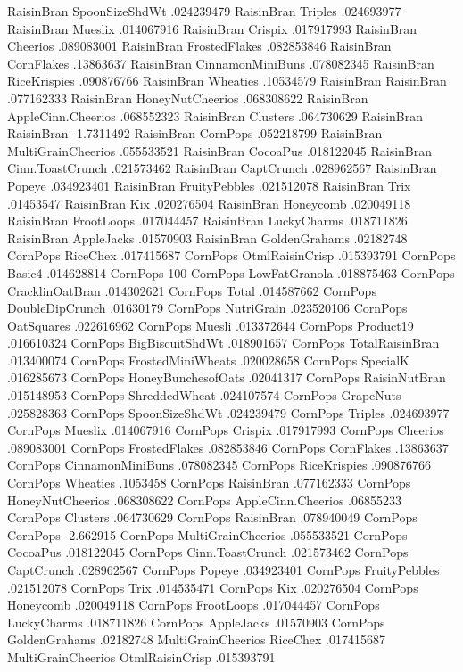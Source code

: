 RaisinBran	SpoonSizeShdWt	.024239479
RaisinBran	Triples	.024693977
RaisinBran	Mueslix	.014067916
RaisinBran	Crispix	.017917993
RaisinBran	Cheerios	.089083001
RaisinBran	FrostedFlakes	.082853846
RaisinBran	CornFlakes	.13863637
RaisinBran	CinnamonMiniBuns	.078082345
RaisinBran	RiceKrispies	.090876766
RaisinBran	Wheaties	.10534579
RaisinBran	RaisinBran	.077162333
RaisinBran	HoneyNutCheerios	.068308622
RaisinBran	AppleCinn.Cheerios	.068552323
RaisinBran	Clusters	.064730629
RaisinBran	RaisinBran	-1.7311492
RaisinBran	CornPops	.052218799
RaisinBran	MultiGrainCheerios	.055533521
RaisinBran	CocoaPus	.018122045
RaisinBran	Cinn.ToastCrunch	.021573462
RaisinBran	CaptCrunch	.028962567
RaisinBran	Popeye	.034923401
RaisinBran	FruityPebbles	.021512078
RaisinBran	Trix	.01453547
RaisinBran	Kix	.020276504
RaisinBran	Honeycomb	.020049118
RaisinBran	FrootLoops	.017044457
RaisinBran	LuckyCharms	.018711826
RaisinBran	AppleJacks	.01570903
RaisinBran	GoldenGrahams	.02182748
CornPops	RiceChex	.017415687
CornPops	OtmlRaisinCrisp	.015393791
CornPops	Basic4	.014628814
CornPops	100%
CornPops	LowFatGranola	.018875463
CornPops	CracklinOatBran	.014302621
CornPops	Total	.014587662
CornPops	DoubleDipCrunch	.01630179
CornPops	NutriGrain	.023520106
CornPops	OatSquares	.022616962
CornPops	Muesli	.013372644
CornPops	Product19	.016610324
CornPops	BigBiscuitShdWt	.018901657
CornPops	TotalRaisinBran	.013400074
CornPops	FrostedMiniWheats	.020028658
CornPops	SpecialK	.016285673
CornPops	HoneyBunchesofOats	.02041317
CornPops	RaisinNutBran	.015148953
CornPops	ShreddedWheat	.024107574
CornPops	GrapeNuts	.025828363
CornPops	SpoonSizeShdWt	.024239479
CornPops	Triples	.024693977
CornPops	Mueslix	.014067916
CornPops	Crispix	.017917993
CornPops	Cheerios	.089083001
CornPops	FrostedFlakes	.082853846
CornPops	CornFlakes	.13863637
CornPops	CinnamonMiniBuns	.078082345
CornPops	RiceKrispies	.090876766
CornPops	Wheaties	.1053458
CornPops	RaisinBran	.077162333
CornPops	HoneyNutCheerios	.068308622
CornPops	AppleCinn.Cheerios	.06855233
CornPops	Clusters	.064730629
CornPops	RaisinBran	.078940049
CornPops	CornPops	-2.662915
CornPops	MultiGrainCheerios	.055533521
CornPops	CocoaPus	.018122045
CornPops	Cinn.ToastCrunch	.021573462
CornPops	CaptCrunch	.028962567
CornPops	Popeye	.034923401
CornPops	FruityPebbles	.021512078
CornPops	Trix	.014535471
CornPops	Kix	.020276504
CornPops	Honeycomb	.020049118
CornPops	FrootLoops	.017044457
CornPops	LuckyCharms	.018711826
CornPops	AppleJacks	.01570903
CornPops	GoldenGrahams	.02182748
MultiGrainCheerios	RiceChex	.017415687
MultiGrainCheerios	OtmlRaisinCrisp	.015393791
